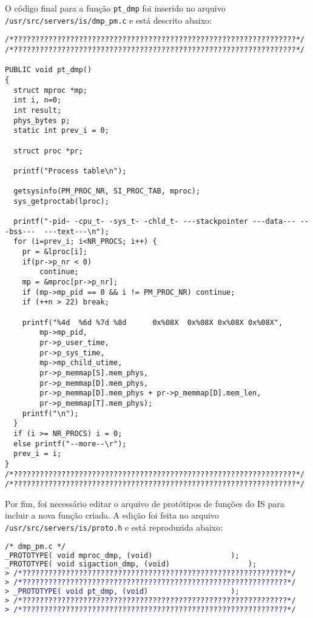 \documentclass[brazil, a4paper]{scrartcl}
\begin{document}
O código final para a função \texttt{pt\_dmp} foi inserido no arquivo
\texttt{/usr/src/servers/is/dmp\_pm.c} e está descrito abaixo:

\begin{lstlisting}[style=customc]
/*?????????????????????????????????????????????????????????????????*/
/*?????????????????????????????????????????????????????????????????*/

PUBLIC void pt_dmp()
{
  struct mproc *mp;
  int i, n=0;
  int result;
  phys_bytes p;
  static int prev_i = 0;

  struct proc *pr;

  printf("Process table\n");

  getsysinfo(PM_PROC_NR, SI_PROC_TAB, mproc);
  sys_getproctab(lproc);

  printf("-pid- -cpu_t- -sys_t- -chld_t- ---stackpointer ---data--- ---bss---  ---text---\n");
  for (i=prev_i; i<NR_PROCS; i++) {
    pr = &lproc[i];
    if(pr->p_nr < 0)
        continue;
    mp = &mproc[pr->p_nr];
  	if (mp->mp_pid == 0 && i != PM_PROC_NR) continue;
  	if (++n > 22) break;

  	printf("%4d  %6d %7d %8d      0x%08X  0x%08X 0x%08X 0x%08X", 
  		mp->mp_pid,
  		pr->p_user_time,
  		pr->p_sys_time,
  		mp->mp_child_utime,
  		pr->p_memmap[S].mem_phys,
  		pr->p_memmap[D].mem_phys,
  		pr->p_memmap[D].mem_phys + pr->p_memmap[D].mem_len,
  		pr->p_memmap[T].mem_phys);
  	printf("\n");
  }
  if (i >= NR_PROCS) i = 0;
  else printf("--more--\r");
  prev_i = i;
}
/*?????????????????????????????????????????????????????????????????*/
/*?????????????????????????????????????????????????????????????????*/
\end{lstlisting}

Por fim, foi necessário editar o arquivo de protótipos de funções do IS
para incluir a nova função criada. A edição foi feita no arquivo 
\texttt{/usr/src/servers/is/proto.h} e está reproduzida abaixo:
\begin{lstlisting}[language=diff]
/* dmp_pm.c */
_PROTOTYPE( void mproc_dmp, (void)					);
_PROTOTYPE( void sigaction_dmp, (void)					);
> /*?????????????????????????????????????????????????????????????*/
> /*?????????????????????????????????????????????????????????????*/
> _PROTOTYPE( void pt_dmp, (void)					);
> /*?????????????????????????????????????????????????????????????*/
> /*?????????????????????????????????????????????????????????????*/
\end{lstlisting}
\end{document}
